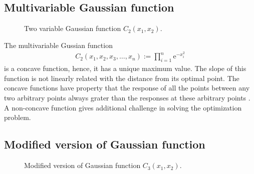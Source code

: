 \documentclass[twocolumn]{svjour3}          %
\newcommand{\me}{\mathrm{e}}
\begin{document}
\subsection{Multivariable Gaussian function}
\begin{figure}
	\centering
	\caption{Two variable Gaussian function $C_2(x_1, x_2)$.}
	\label{Fig:TwoVarGaussian}
\end{figure}
The multivariable Gussian function
\begin{eqnarray}
	C_2(x_1, x_2, x_3, \dots, x_n) := \prod_{i=1}^{n}{\me^{-x_i^2}} \label{Eqn:MultiFactorialNormal}
\end{eqnarray}
is a concave function, hence, it has a unique maximum value. The slope of this function is not linearly related with the distance from its optimal point. The concave functions have property that the response of all the points between any two arbitrary points always grater than the responses at these arbitrary points \cite{antoniou2007practical}. A non-concave function gives additional challenge in solving the optimization problem. 
\subsection{Modified version of Gaussian function}
\begin{figure}
	\centering
	\caption{Modified version of Gaussian function $C_3(x_1, x_2)$.}
	\label{Fig:2GussianFunctionModified}
\end{figure}
\end{document}
